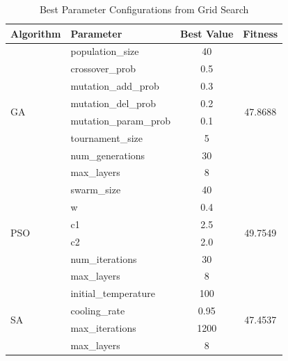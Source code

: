 \begin{table}[htbp]
\centering
\caption{Best Parameter Configurations from Grid Search}
\begin{tabular}{|l|l|c|c|}
\hline
Algorithm & Parameter & Best Value & Fitness \\
\hline
\multirow{8}{*}{GA} & population_size & 40 & \multirow{8}{*}{47.8688} \\
 & crossover_prob & 0.5 & \\
 & mutation_add_prob & 0.3 & \\
 & mutation_del_prob & 0.2 & \\
 & mutation_param_prob & 0.1 & \\
 & tournament_size & 5 & \\
 & num_generations & 30 & \\
 & max_layers & 8 & \\
\hline
\multirow{6}{*}{PSO} & swarm_size & 40 & \multirow{6}{*}{49.7549} \\
 & w & 0.4 & \\
 & c1 & 2.5 & \\
 & c2 & 2.0 & \\
 & num_iterations & 30 & \\
 & max_layers & 8 & \\
\hline
\multirow{4}{*}{SA} & initial_temperature & 100 & \multirow{4}{*}{47.4537} \\
 & cooling_rate & 0.95 & \\
 & max_iterations & 1200 & \\
 & max_layers & 8 & \\
\hline
\end{tabular}
\label{tab:best_parameters}
\end{table}
